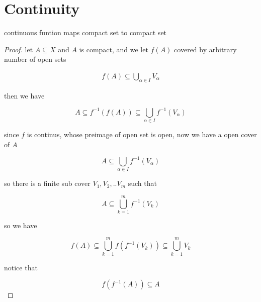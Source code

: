\documentclass[11pt,a4paper]{article}
\begin{document}
\section{Continuity}

\begin{lem}
    continuous funtion maps compact set to compact set
\end{lem}

\begin{proof}
    let $A \subseteq X$ and $A$ is compact, and we let $f(A)$ covered by arbitrary number of open sets

    \begin{align*}
        f(A) \subseteq \bigcup_{\alpha \in I}V_{\alpha}
    \end{align*}

    then we have

    \[
        A \subseteq f^{-1}(f(A)) \subseteq \bigcup_{\alpha \in I}f^{-1}(V_{\alpha})
    \]

    since $f$ is continus, whose preimage of open set is open, now we have a open cover of $A$

    \[
        A \subseteq \bigcup_{\alpha \in I}f^{-1}(V_{\alpha})
    \]

    so there is a finite sub cover $V_1, V_2, .. V_m$ such that

    \[
        A \subseteq \bigcup_{k=1}^{m}f^{-1}(V_{k})
    \]

    so we have

    \[
        f(A)\subseteq \bigcup_{k=1}^{m}f(f^{-1}(V_{k})) \subseteq \bigcup_{k=1}^{m}V_k
    \]

    notice that

    \[
        f(f^{-1}(A)) \subseteq A
    \]
\end{proof}
\end{document}
